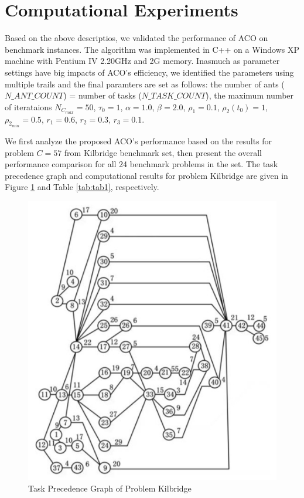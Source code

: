 \section{Computational Experiments}

Based on the above descriptios, we validated the performance of ACO on benchmark instances.
The algorithm was implemented in C++ on a Windows XP machine with Pentium IV 2.20GHz and 2G memory. 
Inasmuch as parameter settings have big impacts of ACO's efficiency, we identified the parameters using multiple trails and the final paramters are set as follows: the number of ants ($N\_ANT\_COUNT$) = number of tasks ($N\_TASK\_COUNT$), the maximum number of iterataions $N_{C_{max}} = 50$, $\tau_0 = 1$, $\alpha = 1.0$, $\beta = 2.0$, $\rho_1 = 0.1$, $\rho_2(t_0) = 1$, $\rho_{2_{min}} = 0.5$, $r_1 = 0.6$, $r_2 = 0.3$, $r_3 = 0.1$.

We first analyze the proposed ACO's performance based on the results for problem $C = 57$ from Kilbridge benchmark set, then present the overall performance comparison for all 24 benchmark problems in the set.
The task precedence graph and computational results for problem Kilbridge are given in Figure \ref{fig:fig1} and Table \ref{tab:tab1}, respectively.

\begin{figure}[h!]
	\begin{center}
		\includegraphics[width=0.6\linewidth]{sections/figure1.jpg}
		\caption{Task Precedence Graph of Problem Kilbridge}
		\label{fig:fig1}
	\end{center}
\end{figure}

